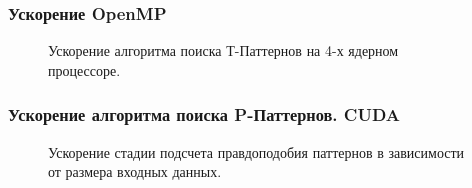 \documentclass[smaller]{beamer}
\begin{document}
\begin{frame}
 \frametitle{Ускорение OpenMP}
\begin{figure}[H]
	\caption{Ускорение алгоритма поиска Т-Паттернов на 4-х ядерном процессоре.}
\end{figure}
    
\end{frame}


\begin{frame}
  \frametitle{Ускорение алгоритма поиска P-Паттернов. CUDA}
\begin{figure}[H]
	\caption{Ускорение стадии подсчета правдоподобия паттернов в зависимости от размера входных данных.}
\end{figure}

\end{frame}
\end{document}
